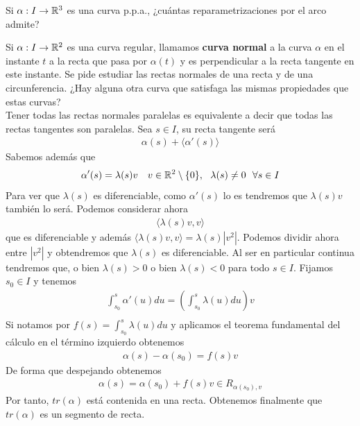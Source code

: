 \begin{ejercicio}
    Si $\alpha : I \to \mathbb{R}^3$ es una curva p.p.a., ¿cuántas reparametrizaciones por el arco admite?
\end{ejercicio}

\begin{ejercicio}
    Si $\alpha : I \to \mathbb{R}^2$ es una curva regular, llamamos \textbf{curva normal} a la curva $\alpha$ en el instante $t$ a la recta que pasa por $\alpha(t)$ y es perpendicular a la recta tangente en este instante. Se pide estudiar las rectas normales de una recta y de una circunferencia. ¿Hay alguna otra curva que satisfaga las mismas propiedades que estas curvas?\\

    Tener todas las rectas normales paralelas es equivalente a decir que todas las rectas tangentes son paralelas. Sea $s\in I$, su recta tangente será 
    \begin{gather*}
        \alpha(s) + \langle \alpha'(s) \rangle
    \end{gather*}
    Sabemos además que 
    \begin{gather*}
        \alpha'(s) = \lambda(s)v\ \ \ v\in \bb{R}^2\setminus\{0\},\ \ \lambda(s)\neq 0 \ \ \forall s \in I
    \end{gather*}
    Para ver que $\lambda(s)$ es diferenciable, como $\alpha'(s)$ lo es tendremos que $\lambda(s)v$ también lo será. Podemos considerar ahora 
    \begin{gather*}
        \langle \lambda(s)v, v \rangle
    \end{gather*}
    que es diferenciable y además $\langle \lambda(s)v, v \rangle = \lambda(s)|v^2|$. Podemos dividir ahora entre $|v^2|$ y obtendremos que $\lambda(s)$ es diferenciable. Al ser en particular continua tendremos que, o bien $\lambda(s)>0$ o bien $\lambda(s)<0$ para todo $s\in I$. Fijamos $s_0\in I$ y tenemos
    \begin{gather*}
        \int_{s_0}^s \alpha'(u)du = \left(\int_{s_0}^s \lambda(u)du\right)v\\
    \end{gather*}
    Si notamos por $f(s)=\int_{s_0}^s \lambda(u)du$ y aplicamos el teorema fundamental del cálculo en el término izquierdo obtenemos
    \begin{gather*}
        \alpha(s)-\alpha(s_0) = f(s)v
    \end{gather*}
    De forma que despejando obtenemos
    \begin{gather*}
        \alpha(s) = \alpha(s_0) + f(s)v\in R_{\alpha(s_0),v}
    \end{gather*}
    Por tanto, $tr(\alpha)$ está contenida en una recta. Obtenemos finalmente que $tr(\alpha)$ es un segmento de recta.\\


\end{ejercicio}

